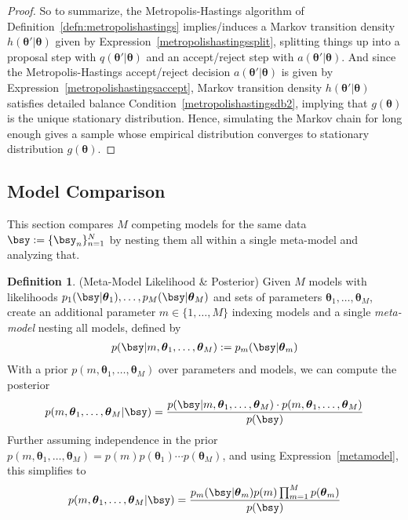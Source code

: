\documentclass[12pt]{article}
\theoremstyle{plain}
\theoremstyle{definition}
\newtheorem{defn}[thm]{Definition}
\theoremstyle{remark}
\newcommand{\bstheta}{\boldsymbol{\theta}}
\newcommand{\nN}{_{n=1}^N}
\begin{document}
\begin{proof}
So to summarize, the Metropolis-Hastings algorithm of
Definition~\ref{defn:metropolishastings} implies/induces a Markov
transition density $h(\bstheta'|\bstheta)$ given by
Expression~\ref{metropolishastingssplit}, splitting things up into a
proposal step with $q(\bstheta'|\bstheta)$ and an accept/reject step
with $a(\bstheta'|\bstheta)$.
And since the Metropolis-Hastings accept/reject decision
$a(\bstheta'|\bstheta)$ is given by
Expression~\ref{metropolishastingsaccept},
Markov transition density $h(\bstheta'|\bstheta)$ satisfies detailed
balance Condition~\ref{metropolishastingsdb2}, implying that
$g(\bstheta)$ is the unique stationary distribution.
Hence, simulating the Markov chain for long enough gives a sample whose
empirical distribution converges to stationary distribution
$g(\bstheta)$.
\end{proof}


\clearpage
\subsection{Model Comparison}

This section compares $M$ competing models for the same data
$\bsy:=\{\bsy_n\}\nN$ by nesting them all within  a single meta-model
and analyzing that.

\begin{defn}(Meta-Model Likelihood \& Posterior)
Given $M$ models with likelihoods
$p_1(\bsy|\bstheta_1),\ldots,p_M(\bsy|\bstheta_M)$ and sets of
parameters $\bstheta_1,\ldots,\bstheta_M$, create an additional
parameter $m\in\{1,\ldots,M\}$ indexing models and a single
\emph{meta-model} nesting all models, defined by
\begin{align}
  p(\bsy|m,\bstheta_1,\ldots,\bstheta_M)
  :=
  p_m(\bsy|\bstheta_m)
  \label{metamodel}
\end{align}
With a prior $p(m,\bstheta_1,\ldots,\bstheta_M)$ over parameters and
models, we can compute the posterior
\begin{align*}
  p(m,\bstheta_1,\ldots,\bstheta_M|\bsy)
  =
  \frac{%
    p(\bsy|m,\bstheta_1,\ldots,\bstheta_M)
    \cdot p(m,\bstheta_1,\ldots,\bstheta_M)
  }{p(\bsy)}
\end{align*}
Further assuming independence in the prior
$p(m,\bstheta_1,\ldots,\bstheta_M)=p(m)p(\bstheta_1)\cdots p(\bstheta_M)$,
and using Expression~\ref{metamodel}, this simplifies to
\begin{align}
  p(m,\bstheta_1,\ldots,\bstheta_M|\bsy)
  =
  \frac{%
    p_m(\bsy|\bstheta_m)
    p(m)\prod_{m=1}^M p(\bstheta_m)
  }{%
    p(\bsy)
  }
  \label{metamodelposterior}
\end{align}
\end{defn}
\end{document}
